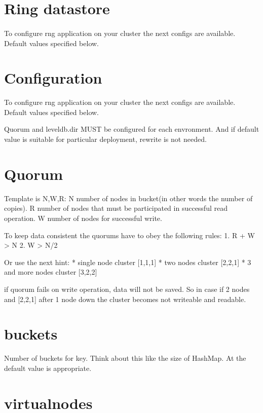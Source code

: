 \section*{Ring datastore}

\paragraph{}
To configure rng application on your cluster the next configs are available. Default values specified below.

\section*{Configuration}
To configure rng application on your cluster the next configs are available. Default values specified below.

Quorum and leveldb.dir MUST be configured for each envronment.
And if default value is suitable for particular deployment, rewrite is not needed.

\section*{Quorum}

Template is N,W,R:
N \- number of nodes in bucket(in other words the number of copies).
R \- number of nodes that must  be participated in successful read operation.
W \- number of nodes for successful write.

To keep data consistent the quorums have to obey the following rules:
1. R + W > N
2. W > N/2

Or use the next hint:
* single node cluster [1,1,1]
* two nodes cluster [2,2,1]
* 3 and more nodes cluster [3,2,2]


if quorum fails on write operation, data will not be saved. So in case if 2 nodes and [2,2,1] after 1 node down
the cluster becomes not writeable and readable.

\section*{buckets}

Number of buckets for key. Think about this like the size of HashMap. At the default value is appropriate.

\section*{virtual\-nodes}

